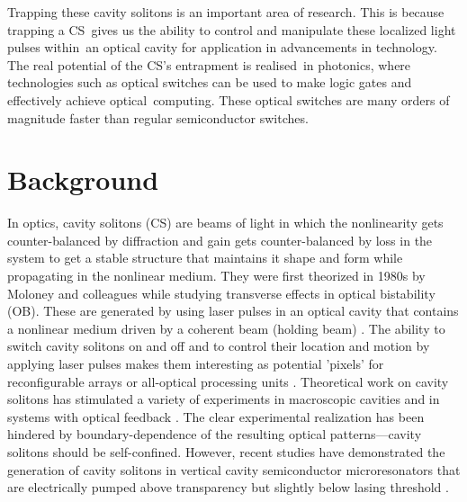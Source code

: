 Trapping these cavity solitons is an important area of research. This is because trapping a CS\
gives us the ability to control and manipulate these localized light pulses within\
an optical cavity for application in advancements in technology. The real potential of the CS's entrapment is realised\
in photonics, where technologies such as optical switches can be used to make logic gates and effectively achieve optical\
computing. These optical switches are many orders of magnitude faster than regular semiconductor switches. 

\section{Background}
In optics, cavity solitons (CS) are beams of light in which the nonlinearity gets counter-balanced by diffraction 
and gain gets counter-balanced by loss in the system to get a stable structure that maintains it shape and form while 
propagating in the nonlinear medium. They were first theorized in 1980s by Moloney and colleagues \cite{newellNonlinearOptics1992} while 
studying transverse effects in optical bistability (OB). These are generated by using laser pulses in an optical cavity that contains 
a nonlinear medium driven by a coherent beam (holding beam) \cite{barlandCavitySolitonsPixels2002}. The ability to switch cavity solitons 
on and off and to control their location and motion by applying laser pulses makes them interesting as potential 'pixels' for reconfigurable 
arrays or all-optical processing units \cite{barlandCavitySolitonsPixels2002}. Theoretical work on cavity solitons has stimulated a variety 
of experiments in macroscopic cavities and in systems with optical feedback \cite{barlandCavitySolitonsPixels2002}.
The clear experimental realization has been hindered by boundary-dependence of the resulting optical patterns—cavity solitons should be self-confined. 
However, recent studies have demonstrated the generation of cavity solitons in vertical cavity semiconductor microresonators that are electrically 
pumped above transparency but slightly below lasing threshold \cite{barlandCavitySolitonsPixels2002}. 

